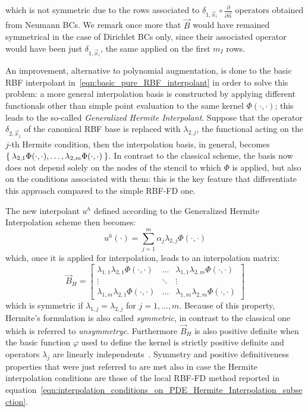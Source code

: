 which is not symmetric due to the rows associated to $\delta_{1,\vec{x}_{i}} \circ \frac{\partial}{\partial \vec{n}}$ operators obtained from Neumann BCs. We remark once more that $\vec{B}$ would have remained symmetrical in the case of Dirichlet BCs only, since their associated operator would have been just $\delta_{1,\vec{x}_{i}}$, the same applied on the first $m_I$ rows.

\smallskip
An improvement, alternative to polynomial augmentation, is done to the basic RBF interpolant in~\eqref{eqn:basic_pure_RBF_interpolant} in order to solve this problem: a more general interpolation basis is constructed by applying different functionals other than simple point evaluation to the same kernel $\Phi(\cdot, \cdot)$; this leads to the so-called \emph{Generalized Hermite Interpolant}. Suppose that the operator $\delta_{2, \vec{x}_j}$ of the canonical RBF base is replaced with $\lambda_{2,j}$, the functional acting on the $j$-th Hermite condition, then the interpolation basis, in general, becomes $\Set{\lambda_{2,1} \Phi(\cdot, \cdot), \dots, \lambda_{2,m} \Phi(\cdot, \cdot)}$. In contrast to the classical scheme, the basis now does not depend solely on the nodes of the stencil to which $\Phi$ is applied, but also on the conditions associated with them: this is the key feature that differentiate this approach compared to the simple RBF-FD one.

The new interpolant $u^h$ defined according to the Generalized Hermite Interpolation scheme then becomes:
\begin{equation}
	\label{eqn:pure_Hermite_interpolant}
	u^h(\cdot) = \sum_{j=1}^{m} \alpha_j \lambda_{2,j} \Phi(\cdot,\cdot)
\end{equation}
which, once it is applied for interpolation, leads to an interpolation matrix:
\begin{equation}
	\vec{B}_H =
	\begin{bmatrix}
		\lambda_{1,1} \lambda_{2,1} \Phi(\cdot, \cdot)  &  \dots  & \lambda_{1,1} \lambda_{2,m} \Phi(\cdot, \cdot)  \\
		\vdots											& \ddots  & \vdots											\\
		\lambda_{1,m} \lambda_{2,1} \Phi(\cdot, \cdot)  &  \dots  & \lambda_{1,m} \lambda_{2,m} \Phi(\cdot, \cdot)
	\end{bmatrix}
\end{equation}
which is symmetric if $\lambda_{1,j} = \lambda_{2,j}$ for $j = 1, \dots, m$. Because of this property, Hermite's formulation is also called \emph{symmetric}, in contrast to the classical one which is referred to \emph{unsymmetryc}. Furthermore $\vec{B}_H$ is also positive definite when the basic function $\varphi$ used to define the kernel is strictly positive definite and operators $\lambda_j$ are linearly independents~\cite{Miotti:phd_thesis}. Symmetry and positive definitiveness properties that were just referred to are met also in case the Hermite interpolation conditions are those of the local RBF-FD method reported in equation~\eqref{eqn:interpolation_conditions_on_PDE_Hermite_Interpolation_subsection}.

